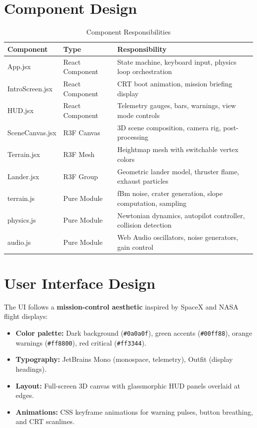 \section{Component Design}

\begin{table}[h]
\centering
\caption{Component Responsibilities}
\label{tab:components}
\begin{tabular}{|p{3.5cm}|p{3cm}|p{6cm}|}
\hline
\textbf{Component} & \textbf{Type} & \textbf{Responsibility} \\
\hline
App.jsx & React Component & State machine, keyboard input, physics loop orchestration \\
\hline
IntroScreen.jsx & React Component & CRT boot animation, mission briefing display \\
\hline
HUD.jsx & React Component & Telemetry gauges, bars, warnings, view mode controls \\
\hline
SceneCanvas.jsx & R3F Canvas & 3D scene composition, camera rig, post-processing \\
\hline
Terrain.jsx & R3F Mesh & Heightmap mesh with switchable vertex colors \\
\hline
Lander.jsx & R3F Group & Geometric lander model, thruster flame, exhaust particles \\
\hline
terrain.js & Pure Module & fBm noise, crater generation, slope computation, sampling \\
\hline
physics.js & Pure Module & Newtonian dynamics, autopilot controller, collision detection \\
\hline
audio.js & Pure Module & Web Audio oscillators, noise generators, gain control \\
\hline
\end{tabular}
\end{table}

\section{User Interface Design}
The UI follows a \textbf{mission-control aesthetic} inspired by SpaceX and NASA flight displays:
\begin{itemize}
    \item \textbf{Color palette:} Dark background (\texttt{\#0a0a0f}), green accents (\texttt{\#00ff88}), orange warnings (\texttt{\#ff8800}), red critical (\texttt{\#ff3344}).
    \item \textbf{Typography:} JetBrains Mono (monospace, telemetry), Outfit (display headings).
    \item \textbf{Layout:} Full-screen 3D canvas with glassmorphic HUD panels overlaid at edges.
    \item \textbf{Animations:} CSS keyframe animations for warning pulses, button breathing, and CRT scanlines.
\end{itemize}

